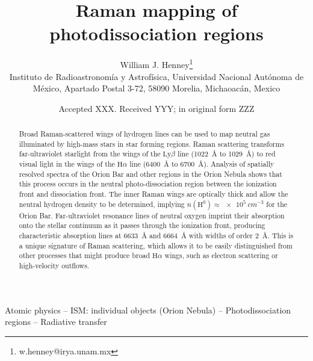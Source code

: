 \documentclass[useAMS, usenatbib, a4paper]{mnras}
\title[Raman mapping of PDRs]
{Raman mapping of photodissociation regions}
\author[Henney]{
  William J. Henney\thanks{w.henney@irya.unam.mx}\\
  \foreignlanguage{spanish}{Instituto de Radioastronomía y
    Astrofísica, Universidad Nacional Autónoma de México, Apartado
    Postal 3-72, 58090 Morelia, Michaoacán, Mexico}}
\date{Accepted XXX. Received YYY; in original form ZZZ}
\newcommand*\chem[1]{\ensuremath{\mathrm{#1}}}
\newcommand\ha{\ensuremath{\text{H}\alpha}}
\newcommand\lyb{\ensuremath{\text{Ly}\beta}}
\begin{document}
\label{firstpage}
\pagerange{\pageref{firstpage}--\pageref{lastpage}}
\maketitle



\begin{abstract}
  Broad Raman-scattered wings of hydrogen lines can be used to
  map neutral gas illuminated by high-mass stars in star forming regions.
  Raman scattering transforms far-ultraviolet starlight
  from the wings of the \lyb{} line (\SI{1022}{\angstrom} to \SI{1029}{\angstrom})
  to red visual light in the wings of the \ha{} line
  (\SI{6400}{\angstrom} to \SI{6700}{\angstrom}).
  Analysis of spatially resolved spectra of the Orion Bar and other regions
  in the Orion Nebula shows that this process occurs in
  the neutral photo-dissociation region between the ionization front and dissociation front.
  The inner Raman wings are optically thick and allow the neutral hydrogen density
  to be determined, implying  \(n(\chem{H^0}) \approx \SI{e5}{cm^{-3}}\) for the Orion Bar.
  Far-ultraviolet resonance lines of neutral oxygen imprint their absorption
  onto the stellar continuum as it passes through the ionization front,
  producing characteristic absorption lines
  at \SI{6633}{\angstrom} and \SI{6664}{\angstrom} with widths of order \SI{2}{\angstrom}.
  This is a unique signature of Raman scattering, which allows it
  to be easily distinguished from other processes that might produce broad \ha{} wings,
  such as electron scattering or high-velocity outflows.
\end{abstract}
\begin{keywords}
  Atomic physics
  -- ISM: individual objects (Orion Nebula)
  -- Photodissociation regions
  -- Radiative transfer
\end{keywords}
\end{document}
